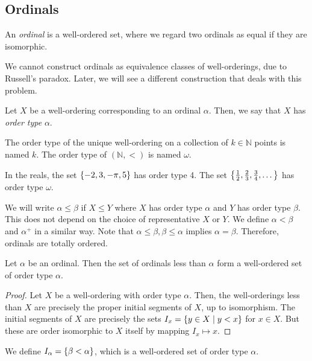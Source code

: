 \subsection{Ordinals}
\begin{definition}
    An \emph{ordinal} is a well-ordered set, where we regard two ordinals as equal if they are isomorphic.
\end{definition}
\begin{remark}
    We cannot construct ordinals as equivalence classes of well-orderings, due to Russell's paradox.
    Later, we will see a different construction that deals with this problem.
\end{remark}
\begin{definition}
    Let \( X \) be a well-ordering corresponding to an ordinal \( \alpha \).
    Then, we say that \( X \) has \emph{order type} \( \alpha \).
\end{definition}
The order type of the unique well-ordering on a collection of \( k \in \mathbb N \) points is named \( k \).
The order type of \( (\mathbb N, <) \) is named \( \omega \).
\begin{example}
    In the reals, the set \( \qty{-2, 3, -\pi, 5} \) has order type 4.
    The set \( \qty{\frac{1}{2}, \frac{2}{3}, \frac{3}{4}, \dots} \) has order type \( \omega \).
\end{example}
We will write \( \alpha \leq \beta \) if \( X \leq Y \) where \( X \) has order type \( \alpha \) and \( Y \) has order type \( \beta \).
This does not depend on the choice of representative \( X \) or \( Y \).
We define \( \alpha < \beta \) and \( \alpha^+ \) in a similar way.
Note that \( \alpha \leq \beta, \beta \leq \alpha \) implies \( \alpha = \beta \).
Therefore, ordinals are totally ordered.
\begin{proposition}
    Let \( \alpha \) be an ordinal.
    Then the set of ordinals less than \( \alpha \) form a well-ordered set of order type \( \alpha \).
\end{proposition}
\begin{proof}
    Let \( X \) be a well-ordering with order type \( \alpha \).
    Then, the well-orderings less than \( X \) are precisely the proper initial segments of \( X \), up to isomorphism.
    The initial segments of \( X \) are precisely the sets \( I_x = \qty{y \in X \mid y < x} \) for \( x \in X \).
    But these are order isomorphic to \( X \) itself by mapping \( I_x \mapsto x \).
\end{proof}
We define \( I_\alpha = \qty{\beta < \alpha} \), which is a well-ordered set of order type \( \alpha \).
